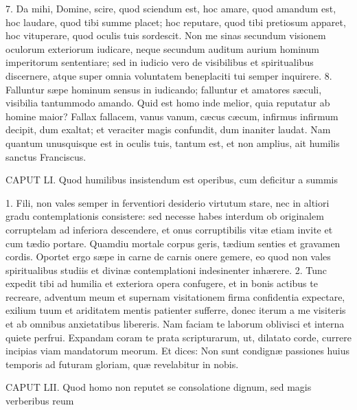 7. Da mihi, Domine, scire, quod sciendum est, hoc amare, quod amandum est, hoc laudare, quod tibi summe placet; hoc reputare, quod tibi pretiosum apparet, hoc vituperare, quod oculis tuis sordescit. Non me sinas secundum visionem oculorum exteriorum iudicare, neque secundum auditum aurium hominum imperitorum sententiare; sed in iudicio vero de visibilibus et spiritualibus discernere, atque super omnia voluntatem beneplaciti tui semper inquirere.
8. Falluntur sæpe hominum sensus in iudicando; falluntur et amatores sæculi, visibilia tantummodo amando. Quid est homo inde melior, quia reputatur ab homine maior? Fallax fallacem, vanus vanum, cæcus cæcum, infirmus infirmum decipit, dum exaltat; et veraciter magis confundit, dum inaniter laudat. Nam quantum unusquisque est in oculis tuis, tantum est, et non amplius, ait humilis sanctus Franciscus.


CAPUT LI.
Quod humilibus insistendum est operibus, cum deficitur a summis

1. Fili, non vales semper in ferventiori desiderio virtutum stare, nec in altiori gradu contemplationis consistere: sed necesse habes interdum ob originalem corruptelam ad inferiora descendere, et onus corruptibilis vitæ etiam invite et cum tædio portare. Quamdiu mortale corpus geris, tædium senties et gravamen cordis. Oportet ergo sæpe in carne de carnis onere gemere, eo quod non vales spiritualibus studiis et divinæ contemplationi indesinenter inhærere.
2. Tunc expedit tibi ad humilia et exteriora opera confugere, et in bonis actibus te recreare, adventum meum et supernam visitationem firma confidentia expectare, exilium tuum et ariditatem mentis patienter sufferre, donec iterum a me visiteris et ab omnibus anxietatibus libereris. Nam faciam te laborum oblivisci et interna quiete perfrui. Expandam coram te prata scripturarum, ut, dilatato corde, currere incipias viam mandatorum meorum. Et dices: Non sunt condignæ passiones huius temporis ad futuram gloriam, quæ revelabitur in nobis.


CAPUT LII.
Quod homo non reputet se consolatione dignum, sed magis verberibus reum

